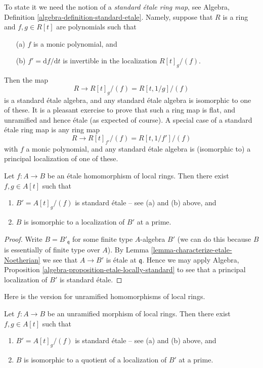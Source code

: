 \medskip\noindent
To state it we need the notion of a {\it standard \'etale ring map}, see
Algebra, Definition \ref{algebra-definition-standard-etale}.
Namely, suppose that $R$ is a ring and $f, g \in R[t]$ are polynomials
such that
\begin{enumerate}
\item[(a)] $f$ is a monic polynomial, and
\item[(b)] $f' = \text{d}f/\text{d}t$ is invertible in the localization
$R[t]_g/(f)$.
\end{enumerate}
Then the map
$$
R \longrightarrow R[t]_g/(f) = R[t, 1/g]/(f)
$$
is a standard \'etale algebra, and any standard \'etale algebra is isomorphic
to one of these. It is a pleasant exercise to prove that such a ring map
is flat, and unramified and hence \'etale (as expected of course).
A special case of a standard \'etale ring map is any ring map
$$
R \longrightarrow R[t]_{f'}/(f) = R[t, 1/f']/(f)
$$
with $f$ a monic polynomial, and any standard \'etale algebra is (isomorphic to)
a principal localization of one of these.

\begin{theorem}
\label{theorem-structure-etale}
Let $f : A \to B$ be an \'etale homomorphism of local rings.
Then there exist $f, g \in A[t]$ such that
\begin{enumerate}
\item $B' = A[t]_g/(f)$ is standard \'etale -- see (a) and (b) above, and
\item $B$ is isomorphic to a localization of $B'$ at a prime.
\end{enumerate}
\end{theorem}

\begin{proof}
Write $B = B'_{\mathfrak q}$ for some finite type $A$-algebra $B'$
(we can do this because $B$ is essentially of finite type over $A$).
By Lemma \ref{lemma-characterize-etale-Noetherian}
we see that $A \to B'$ is \'etale at $\mathfrak q$.
Hence we may apply
Algebra, Proposition \ref{algebra-proposition-etale-locally-standard}
to see that a principal localization of $B'$ is standard \'etale.
\end{proof}

\noindent
Here is the version for unramified homomorphisms of local rings.

\begin{theorem}
\label{theorem-structure-unramified}
Let $f : A \to B$ be an unramified morphism of local rings.
Then there exist $f, g \in A[t]$ such that
\begin{enumerate}
\item $B' = A[t]_g/(f)$ is standard \'etale -- see (a) and (b) above, and
\item $B$ is isomorphic to a quotient of a localization of $B'$ at a prime.
\end{enumerate}
\end{theorem}

